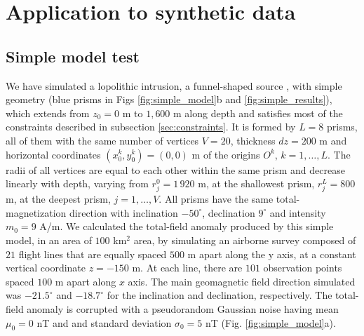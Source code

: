 \section{Application to synthetic data}\label{sec:synthetic}

\subsection{Simple model test}

We have simulated a lopolithic intrusion, a funnel-shaped source \cite[]{cawthorn-2018}, with simple geometry (blue prisms in Figs \ref{fig:simple_model}b and \ref{fig:simple_results}), which extends from $z_0=0$ m to $1,600$ m along depth and satisfies most of the constraints described in subsection \ref{sec:constraints}. It is formed by $L=8$ prisms, all of them with the same number of vertices $ V = 20 $, thickness $ dz = 200 $ m and horizontal coordinates $ (x_0^k, y_0^k) = (0, 0) $ m of the origins $O^k$, $k=1,\dots,L$. The radii of all vertices are equal to each other within the same prism and decrease linearly with depth, varying from $r_j^0=1\,920$ m, at the shallowest prism, $r_j^L=800$ m, at the deepest prism, $j=1,\dots, V$. All prisms have the same total-magnetization direction with inclination $ -50^\circ $, declination $ 9^\circ $ and intensity $ m_0 = 9 $ A/m. We calculated the total-field anomaly produced by this simple model, in an area of $ 100 $ km$^2$ area, by simulating an airborne survey composed of $ 21 $ flight lines that are equally spaced $ 500 $ m apart along the y axis, at a constant vertical coordinate $ z = -150 $ m. At each line, there are $ 101 $ observation points spaced $100$ m apart along $ x $ axis. 
The main geomagnetic field direction simulated was  $ -21.5^\circ $ and  $ -18.7^\circ $ for the inclination and declination, respectively. 
The total-field anomaly is corrupted with a pseudorandom Gaussian noise having mean $ \mu_0=0 $ nT and and standard deviation $ \sigma_0 = 5 $ nT (Fig. \ref{fig:simple_model}a).


